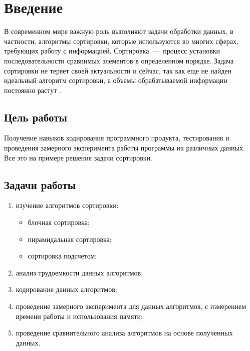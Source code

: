 \setcounter{page}{3}
\chapter*{Введение}

В современном мире важную роль выполняют задачи обработки данных, в частности, алгоритмы сортировки, которые используются во многих сферах, требующих работу с информацией. 
Сортировка~---~процесс установки последовательности сравнимых элементов в определенном порядке.
Задача сортировки не теряет своей актуальности и сейчас, так как еще не найден идеальный алгоритм сортировки, а объемы обрабатываемой информации постоянно растут \cite{bib:1}.

\section*{Цель работы}

Получение навыков кодирования программного продукта, тестирования и проведения замерного эксперимента работы программы на различных данных. Все это на примере решения задачи сортировки.

\section*{Задачи работы}

\begin{enumerate}[label={\arabic*)}]
	\item изучение алгоритмов сортировки:
	\begin{itemize}
		\item блочная сортировка;
		\item пирамидальная сортировка;
		\item сортировка подсчетом;
	\end{itemize}
	\item анализ трудоемкости данных алгоритмов;
	\item кодирование данных алгоритмов;
	\item проведение замерного эксперимента для данных алгоритмов, с измерением времени работы и использования памяти; 
	\item проведение сравнительного анализа алгоритмов на основе полученных данных.
\end{enumerate}

\newpage